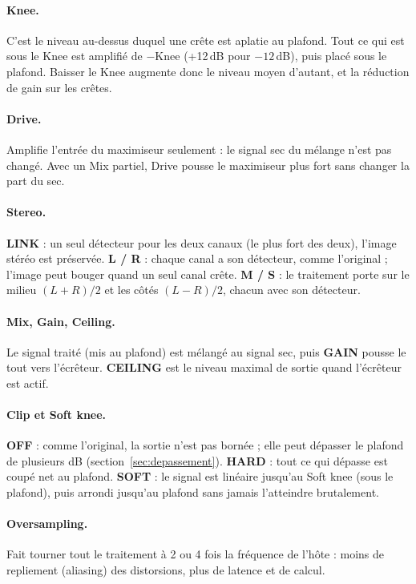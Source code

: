 \documentclass[a4paper,11pt]{article}
\newcommand{\ctl}[1]{\textsf{\textbf{#1}}}   %
\newcommand{\dB}{\,dB}
\begin{document}
\paragraph{Knee.} C'est le niveau au-dessus duquel une crête est \og aplatie\fg{} au plafond.
Tout ce qui est sous le Knee est amplifié de $-\mathrm{Knee}$ (+12\dB{} pour $-12$\dB), puis
placé sous le plafond. Baisser le Knee augmente donc le niveau moyen d'autant, et la réduction de
gain sur les crêtes.

\paragraph{Drive.} Amplifie l'entrée du maximiseur seulement : le signal sec du mélange n'est pas
changé. Avec un Mix partiel, Drive pousse le maximiseur plus fort sans changer la part du sec.

\paragraph{Stereo.} \ctl{LINK} : un seul détecteur pour les deux canaux (le plus fort des deux),
l'image stéréo est préservée. \ctl{L / R} : chaque canal a son détecteur, comme l'original ;
l'image peut bouger quand un seul canal crête. \ctl{M / S} : le traitement porte sur le milieu
$(L+R)/2$ et les côtés $(L-R)/2$, chacun avec son détecteur.

\paragraph{Mix, Gain, Ceiling.} Le signal traité (mis au plafond) est mélangé au signal sec,
puis \ctl{GAIN} pousse le tout vers l'écrêteur. \ctl{CEILING} est le niveau maximal de sortie
quand l'écrêteur est actif.

\paragraph{Clip et Soft knee.} \ctl{OFF} : comme l'original, la sortie n'est pas bornée ; elle
peut dépasser le plafond de plusieurs dB (section~\ref{sec:depassement}). \ctl{HARD} : tout ce
qui dépasse est coupé net au plafond. \ctl{SOFT} : le signal est linéaire jusqu'au Soft knee
(sous le plafond), puis arrondi jusqu'au plafond sans jamais l'atteindre brutalement.

\paragraph{Oversampling.} Fait tourner tout le traitement à 2 ou 4 fois la fréquence de l'hôte :
moins de repliement (aliasing) des distorsions, plus de latence et de calcul.
\end{document}

